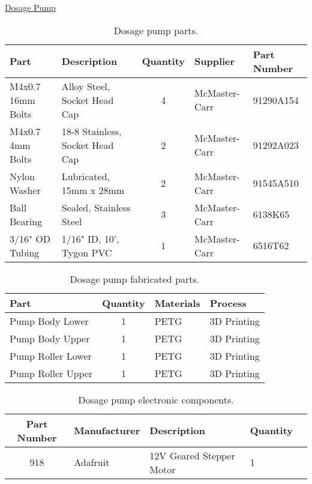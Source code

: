\uline{Dosage Pump}
\begin{table}[!ht]
    \centering
    \begin{tabular}{|l|l|c|l|l|}
    \hline
        Part                & Description                       & Quantity  & Supplier      & Part Number   \\ \hline
        M4x0.7 16mm Bolts   & Alloy Steel, Socket Head Cap      & 4         & McMaster-Carr & 91290A154     \\ \hline
        M4x0.7 4mm Bolts    & 18-8 Stainless, Socket Head Cap   & 2         & McMaster-Carr & 91292A023     \\ \hline
        Nylon Washer        & Lubricated, 15mm x 28mm           & 2         & McMaster-Carr & 91545A510     \\ \hline
        Ball Bearing        & Sealed, Stainless Steel           & 3         & McMaster-Carr & 6138K65       \\ \hline
        3/16" OD Tubing     & 1/16" ID, 10', Tygon PVC          & 1         & McMaster-Carr & 6516T62       \\ \hline
    \end{tabular}
    \caption{Dosage pump parts.}
    \label{tab:aeroponics_dosagepump_parts}
\end{table}

\begin{table}[!ht]
    \centering
    \begin{tabular}{|l|c|l|l|}
    \hline
        Part                & Quantity  & Materials & Process       \\ \hline
        Pump Body Lower     & 1         & PETG      & 3D Printing   \\ \hline
        Pump Body Upper     & 1         & PETG      & 3D Printing   \\ \hline
        Pump Roller Lower   & 1         & PETG      & 3D Printing   \\ \hline
        Pump Roller Upper   & 1         & PETG      & 3D Printing   \\ \hline
    \end{tabular}
    \caption{Dosage pump fabricated parts.}
    \label{tab:aeroponics_dosagepump_fabrication}
\end{table}

\begin{table}[!ht]
    \centering
    \begin{tabular}{|c|l|l|l|c|}
    \hline
        Part Number   & Manufacturer  & Description               & Quantity  \\ \hline
        918           & Adafruit      & 12V Geared Stepper Motor  & 1         \\ \hline
    \end{tabular}
    \caption{Dosage pump electronic components.}
    \label{tab:aeroponics_dosagepump_components}
\end{table}


